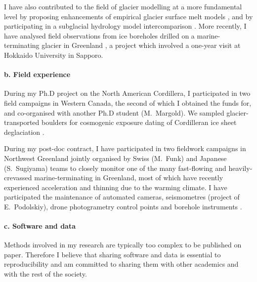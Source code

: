 \documentclass{article}
\begin{document}
    I have also contributed to the field of glacier modelling at a more
    fundamental level by proposing enhancements of empirical glacier surface
    melt models \citep{Seguinot.2013, Seguinot.Rogozhina.2014}, and by
    participating in a subglacial hydrology model intercomparison
    \citep{Fleurian.etal.2018}. More recently, I have analysed field
    observations from ice boreholes drilled on a marine-terminating glacier
    in Greenland \citep{Seguinot.etal.Inreview}, a project which involved a
    one-year visit at Hokkaido University in Sapporo.

\paragraph{b. Field experience}

    During my Ph.D project on the North American Cordillera, I participated in
    two field campaigns in Western Canada, the second of which I obtained the
    funds for, and co-organised with another Ph.D student (M.~Margold). We
    sampled glacier-transported boulders for cosmogenic exposure dating of
    Cordilleran ice sheet deglaciation \citep{Menounos.etal.2017}.

    During my post-doc contract, I have participated in two fieldwork campaigns
    in Northwest Greenland jointly organised by Swiss (M.~Funk) and Japanese
    (S.~Sugiyama) teams to closely monitor one of the many fast-flowing and
    heavily-crevassed marine-terminating in Greenland, most of which have
    recently experienced acceleration and thinning due to the warming climate.
    I have participated the maintenance of automated cameras, seismometres
    (project of E.~Podolskiy), drone photogrametry control points
    \citep{Jouvet.etal.2017, Jouvet.etal.2018} and borehole instruments
    \citep{Seguinot.etal.Inreview}.

\paragraph{c. Software and data}

    Methods involved in my research are typically too complex to be published
    on paper. Therefore I believe that sharing software and data is essential
    to reproducibility and am committed to sharing them with other academics
    and with the rest of the society.
\end{document}
